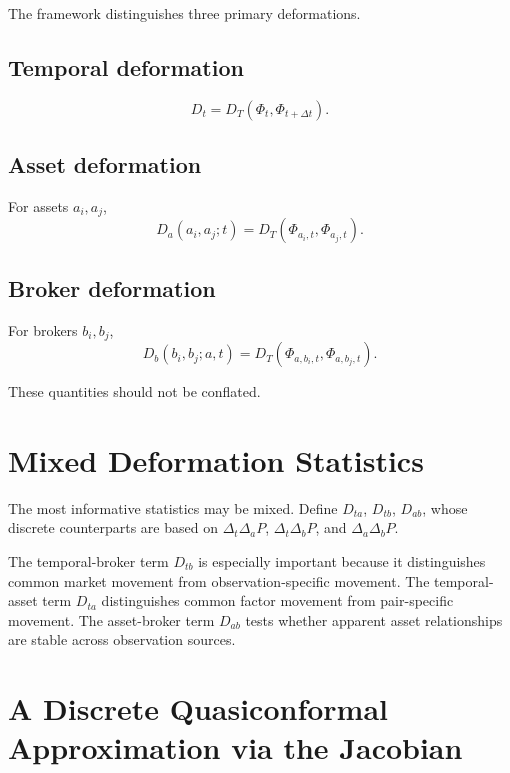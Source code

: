 \documentclass[11pt,a4paper]{article}
\numberwithin{equation}{section}
\begin{document}
The framework distinguishes three primary deformations.

\subsection{Temporal deformation}
\[
D_t=D_T(\Phi_t,\Phi_{t+\Delta t}).
\]

\subsection{Asset deformation}
For assets $a_i,a_j$,
\begin{equation}
D_a(a_i,a_j;t)=D_T(\Phi_{a_i,t},\Phi_{a_j,t}).
\end{equation}

\subsection{Broker deformation}
For brokers $b_i,b_j$,
\begin{equation}
D_b(b_i,b_j;a,t)=D_T(\Phi_{a,b_i,t},\Phi_{a,b_j,t}).
\end{equation}

These quantities should not be conflated.

\section{Mixed Deformation Statistics}

The most informative statistics may be mixed. Define $D_{ta}$,
$D_{tb}$, $D_{ab}$, whose discrete counterparts are based on
$\Delta_t\Delta_aP$, $\Delta_t\Delta_bP$, and $\Delta_a\Delta_bP$.

The temporal-broker term $D_{tb}$ is especially important because it
distinguishes common market movement from observation-specific
movement. The temporal-asset term $D_{ta}$ distinguishes common
factor movement from pair-specific movement. The asset-broker term
$D_{ab}$ tests whether apparent asset relationships are stable
across observation sources.

\section{A Discrete Quasiconformal Approximation via the Jacobian}
\end{document}

